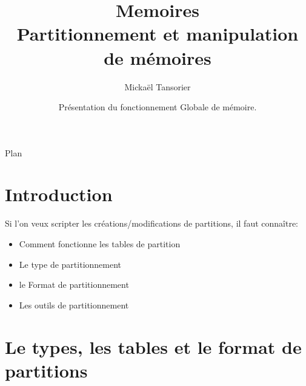 \documentclass[compress]{beamer}
\title[U-Boot]{Memoires \\ \textbf{Partitionnement et manipulation de mémoires}}
\author[Mickaël Tansorier]{Mickaël Tansorier}
\date[Août 2018]{Présentation du fonctionnement Globale de mémoire.}
\begin{document}


\begin{frame}
\titlepage
\end{frame}



\begin{frame}{Plan}
\tableofcontents[hideallsubsections]
\end{frame}

\section{Introduction}

\begin{frame}{}
Si l'on veux scripter les créations/modifications de partitions, il faut connaître:
\begin{itemize}
	\item Comment fonctionne les tables de partition
	\item Le type de partitionnement
	\item le Format de partitionnement
	\item Les outils de partitionnement
\end{itemize}
\end{frame}



\section{Le types, les tables et le format de partitions}
\end{document}
